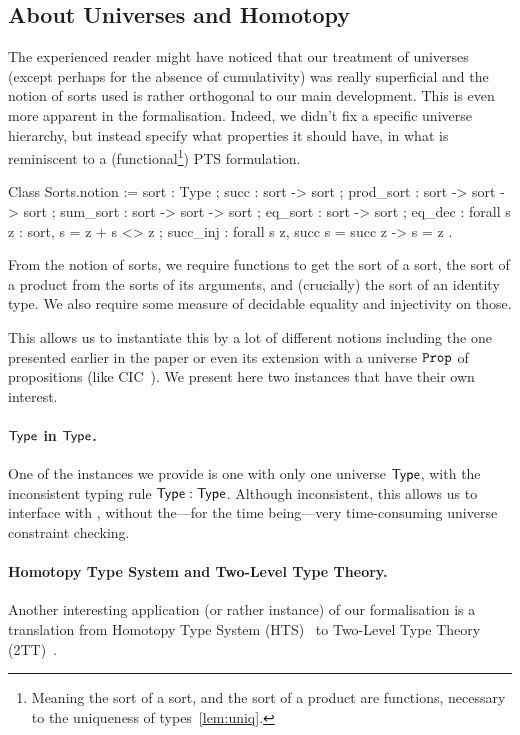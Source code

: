\subsection{About Universes and Homotopy}
\label{sec:sorts}

The experienced reader might have noticed that our treatment of universes
(except perhaps for the absence of cumulativity) was really superficial and the
notion of sorts used is rather orthogonal to our main development.
This is even more apparent in the formalisation. Indeed, we didn't fix a
specific universe hierarchy, but instead specify what properties it should
have, in what is reminiscent to a (functional\footnote{Meaning the sort of a
sort, and the sort of a product are functions, necessary to the uniqueness of
types~\eqref{lem:uniq}.}) PTS formulation.
%
\begin{coq}
Class Sorts.notion := {
  sort : Type ;
  succ : sort -> sort ;
  prod_sort : sort -> sort -> sort ;
  sum_sort : sort -> sort -> sort ;
  eq_sort : sort -> sort ;
  eq_dec : forall s z : sort, {s = z} + {s <> z} ;
  succ_inj : forall s z, succ s = succ z -> s = z
}.
\end{coq}
%
From the notion of sorts, we require functions to get the sort of a sort,
the sort of a product from the sorts of its arguments, and (crucially) the sort
of an identity type.
We also require some measure of decidable equality and injectivity on those.

This allows us to instantiate this by a lot of different notions including the
one presented earlier in the paper or even its extension with a universe $\texttt{Prop}$
of propositions (like CIC~\cite{bertot2004interactive}). We present here two
instances that have their own interest.

\paragraph{$\mathsf{Type}$ in $\mathsf{Type}$.}
One of the instances we provide is one with only one universe $\mathsf{Type}$, with the
inconsistent typing rule $\mathsf{Type} : \mathsf{Type}$.
Although inconsistent, this allows us to interface with \TemplateCoq, without
the---for the time being---very time-consuming universe constraint checking.

\paragraph{Homotopy Type System and Two-Level Type Theory.}
Another interesting application (or rather instance) of our formalisation
is a translation from Homotopy Type System (HTS)~\cite{hts-sota} to
Two-Level Type Theory
(2TT)~\cite{DBLP:journals/corr/AltenkirchCK16,DBLP:journals/corr/AnnenkovCK17}.

